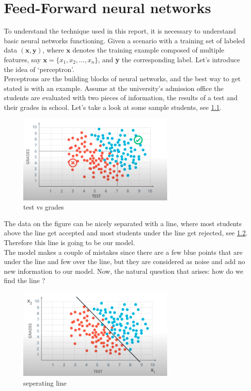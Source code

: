 \chapter{Feed-Forward neural networks}
To understand the technique used in this report, it is necessary to understand basic neural networks functioning.
Given a scenario with a training set of labeled data $(\textbf{x}, \textbf{y})$, where $\textbf{x}$ denotes the training example
composed of multiple features, say $\textbf{x} = \{x_{1}, x_{2}, \ldots, x_{n}\}$, and \textbf{y} the corresponding label.
Let's introduce the idea of `perceptron'. \\
Perceptrons are the building blocks of neural networks, and the best way to get stated is with an example.
Assume at the university's admission office the students are evaluated with two pieces of information, the results of a test and their grades in school. Let's take a look at some sample students, see \cref{fig:perceptron}.

\begin{figure}[ht]
  \centering
  \includegraphics[width=0.7\textwidth]{figs/fig1.png}
  \caption{test vs grades }\label{fig:perceptron}
\end{figure}

The data on the figure can be nicely separated with a line, where most students above the line get accepted and most students under the line get rejected, see \cref{fig:line}. Therefore this line is going to be our model. \\
The model makes a couple of mistakes since there are a few blue points that are under the line and few over the line, but they are considered as noise and add no new information to our model. Now, the natural question that arises: how do we find the line ?

\begin{figure}[htbp]
  \centering
  \includegraphics[width=0.7\textwidth]{figs/fig2.png}
  \caption{seperating line}\label{fig:line}
\end{figure}

